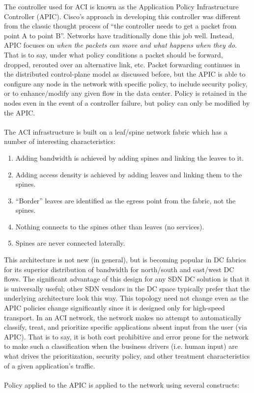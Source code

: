 The controller used for ACI is known as the Application Policy Infrastructure
Controller (APIC). Cisco’s approach in developing this controller was
different from the classic thought process of ``the controller needs to get a
packet from point A to point B''. Networks have traditionally done this job
well. Instead, APIC focuses on \textit{when the packets can move and what
happens when they do}. That is to say, under what policy conditions a
packet should be forward, dropped, rerouted over an alternative link, etc.
Packet forwarding continues in the distributed control-plane model as
discussed before, but the APIC is able to configure any node in the network
with specific policy, to include security policy, or to enhance/modify any
given flow in the data center. Policy is retained in the nodes even in the
event of a controller failure, but policy can only be modified by the APIC.
\\ \\
The ACI infrastructure is built on a leaf/spine network fabric which has a
number of interesting characteristics:

\begin{enumerate}
  \item Adding bandwidth is achieved by adding spines and linking the leaves to it.
  \item Adding access density is achieved by adding leaves and linking them to the spines.
  \item ``Border'' leaves are identified as the egress point from the fabric, not the spines.
  \item Nothing connects to the spines other than leaves (no services).
  \item Spines are never connected laterally.
\end{enumerate}

This architecture is not new (in general), but is becoming popular in DC
fabrics for its superior distribution of bandwidth for north/south and
east/west DC flows. The significant advantage of this design for any SDN DC
solution is that it is universally useful; other SDN vendors in the DC space
typically prefer that the underlying architecture look this way. This topology
need not change even as the APIC policies change significantly since it is
designed only for high-speed transport. In an ACI network, the network makes
no attempt to automatically classify, treat, and prioritize specific
applications absent input from the user (via APIC). That is to say, it is both
cost prohibitive and error prone for the network to make such a classification
when the business drivers (i.e. human input) are what drives the
prioritization, security policy, and other treatment characteristics of a
given application's traffic.
\\ \\
Policy applied to the APIC is applied to the network using several constructs:

